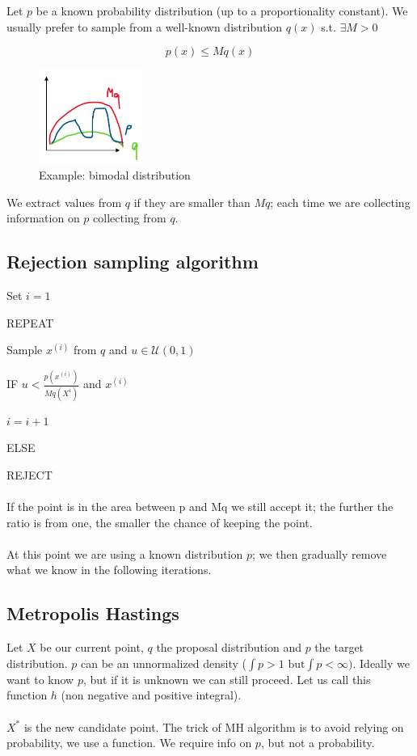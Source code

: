Let $p$ be a known probability distribution (up to a proportionality
constant). We usually prefer to sample from a well-known distribution
$q(x)$ s.t. $\exists M>0$

$$
p(x) \leq M q(x)
$$


\begin{figure}
\centering
\includegraphics[width=0.3\textwidth]{distribution.png}
\caption{Example: bimodal distribution}
\end{figure}
\noindent
We extract values from $q$ if they are smaller than $Mq$; each time we
are collecting information on $p$ collecting from $q$.

\subsection{Rejection sampling algorithm}

Set $i=1$

REPEAT

Sample $x^{(i)}$ from $q$ and $u \in \mathcal{U}(0,1)$

IF $u < \frac{p(x^{(i)})}{Mq(X^i)}$ and $x^{(i)}$

$i=i+1$

ELSE

REJECT
\\
\\
\noindent
If the point is in the area between p and Mq we still accept it; the
further the ratio is from one, the smaller the chance of keeping the
point.
\\
\\
\noindent
At this point we are using a known distribution $p$; we then gradually
remove what we know in the following iterations.


\subsection{Metropolis Hastings}

Let $X$ be our current point, $q$ the proposal distribution and $p$ the
target distribution. $p$ can be an unnormalized density
($\int p > 1 \text{ but} \int p < \infty)$. Ideally we want to know $p$,
but if it is unknown we can still proceed. Let us call this function $h$
(non negative and positive integral).
\\
\\
\noindent
$X^*$ is the new candidate point. The trick of MH algorithm is to avoid
relying on probability, we use a function. We require info on $p$, but
not a probability.

